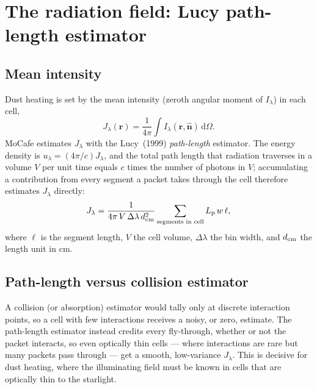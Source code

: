 \documentclass[english,a4paper]{kiseon_memo}
\newcommand{\Jlam}{J_\lambda}
\newcommand{\nhat}{\hat{\mathbf n}}
\newcommand{\rvec}{\mathbf r}
\newcommand{\dd}{\mathrm{d}}
\begin{document}
\section{The radiation field: Lucy path-length estimator}\label{sec:jlam}

\subsection{Mean intensity}
Dust heating is set by the mean intensity (zeroth angular moment of $I_\lambda$)
in each cell,
\begin{equation}
  \Jlam(\rvec)=\frac{1}{4\pi}\!\int I_\lambda(\rvec,\nhat)\,\dd\Omega .
\end{equation}
MoCafe estimates $\Jlam$ with the Lucy~(1999) \emph{path-length} estimator.  The
energy density is $u_\lambda = (4\pi/c)\Jlam$, and the total path length that
radiation traverses in a volume $V$ per unit time equals $c$ times the number of
photons in $V$; accumulating a contribution from every segment a packet takes
through the cell therefore estimates $\Jlam$ directly:
\begin{equation}
  \Jlam = \frac{1}{4\pi\,V\,\Delta\lambda\,d_{\rm cm}^2}
          \sum_{\text{segments in cell}} L_{\rm p}\, w\, \ell,
  \label{eq:jlucy}
\end{equation}
where $\ell$ is the segment length, $V$ the cell volume, $\Delta\lambda$ the bin
width, and $d_{\rm cm}$ the length unit in cm.

\subsection{Path-length versus collision estimator}
A collision (or absorption) estimator would tally only at discrete interaction
points, so a cell with few interactions receives a noisy, or zero, estimate.
The path-length estimator instead credits every fly-through, whether or not the
packet interacts, so even optically thin cells --- where interactions are rare
but many packets pass through --- get a smooth, low-variance $\Jlam$.  This is
decisive for dust heating, where the illuminating field must be known in cells
that are optically thin to the starlight.
\end{document}
